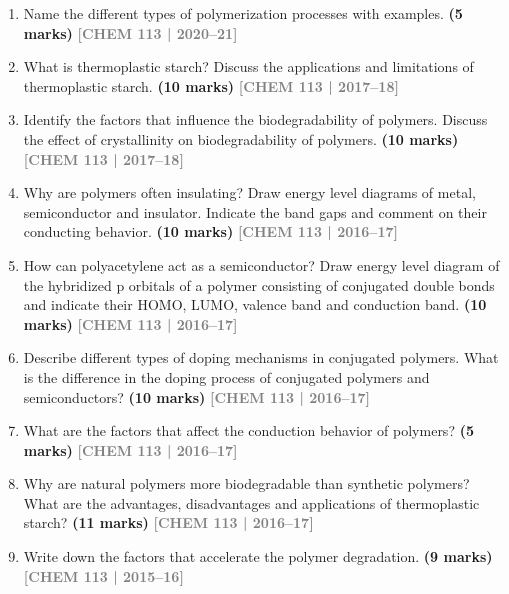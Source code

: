\documentclass[12pt,a3paper]{article}
\newcommand{\yr}[1]{\hfill\textcolor{gray}{\small\textbf{[#1]}}}
\newcommand{\mk}[1]{\textcolor{orange!70!black}{\small\textbf{(#1 marks)}}}
\begin{document}
\begin{enumerate}
\item Name the different types of polymerization processes with examples. \mk{5}
\yr{CHEM 113 | 2020--21}





\item What is thermoplastic starch? Discuss the applications and limitations of thermoplastic starch. \mk{10}
\yr{CHEM 113 | 2017--18}



\item Identify the factors that influence the biodegradability of polymers. Discuss the effect of crystallinity on biodegradability of polymers. \mk{10}
\yr{CHEM 113 | 2017--18}



\item Why are polymers often insulating? Draw energy level diagrams of metal, semiconductor and insulator. Indicate the band gaps and comment on their conducting behavior. \mk{10}
\yr{CHEM 113 | 2016--17}



\item How can polyacetylene act as a semiconductor? Draw energy level diagram of the hybridized p orbitals of a polymer consisting of conjugated double bonds and indicate their HOMO, LUMO, valence band and conduction band. \mk{10}
\yr{CHEM 113 | 2016--17}



\item Describe different types of doping mechanisms in conjugated polymers. What is the difference in the doping process of conjugated polymers and semiconductors? \mk{10}
\yr{CHEM 113 | 2016--17}



\item What are the factors that affect the conduction behavior of polymers? \mk{5}
\yr{CHEM 113 | 2016--17}



\item Why are natural polymers more biodegradable than synthetic polymers? What are the advantages, disadvantages and applications of thermoplastic starch? \mk{11}
\yr{CHEM 113 | 2016--17}



\item Write down the factors that accelerate the polymer degradation. \mk{9}
\yr{CHEM 113 | 2015--16}




\end{enumerate}
\end{document}

